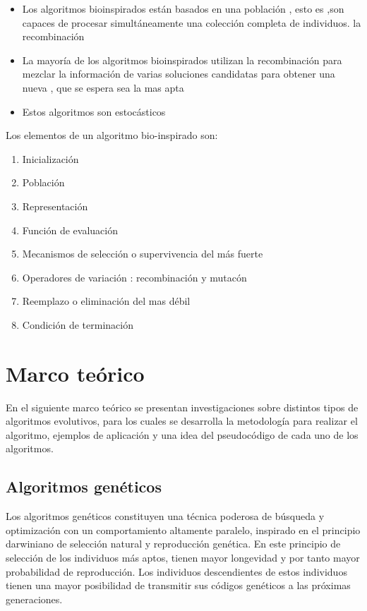 \documentclass{article}
\begin{document}
\begin{itemize}
    \item Los algoritmos bioinspirados están basados en una población , esto es ,son capaces de procesar simultáneamente una colección completa de individuos. la recombinación 
    \item La mayoría de los algoritmos bioinspirados utilizan la recombinación para mezclar la información de varias soluciones candidatas para obtener una nueva , que se espera sea la mas apta
    \item Estos algoritmos son estocásticos 
    
\end{itemize}
Los elementos de un algoritmo bio-inspirado son:
\begin{enumerate}
    \item Inicializaci\'on
    \item Poblaci\'on
    \item Representaci\'on
    \item Funci\'on de evaluaci\'on
    \item Mecanismos de selecci\'on o supervivencia del m\'as fuerte
    \item Operadores de variaci\'on : recombinaci\'on y mutac\'on
    \item Reemplazo o eliminaci\'on del mas débil
    \item Condici\'on de terminaci\'on
\end{enumerate}



\section{Marco teórico}
En el siguiente marco teórico se presentan investigaciones sobre distintos tipos de algoritmos evolutivos, para los cuales se desarrolla la metodología para realizar el algoritmo, ejemplos de aplicación y una idea del pseudocódigo de cada uno de los algoritmos.

\subsection{Algoritmos genéticos}

Los algoritmos genéticos constituyen una técnica poderosa de búsqueda y
optimización con un comportamiento altamente paralelo, inspirado en el principio
darwiniano de selección natural y reproducción genética. En este principio de selección
de los individuos más aptos, tienen mayor longevidad y por tanto mayor probabilidad de
reproducción. Los individuos descendientes de estos individuos tienen una mayor
posibilidad de transmitir sus códigos genéticos a las próximas generaciones. \\
\end{document}
